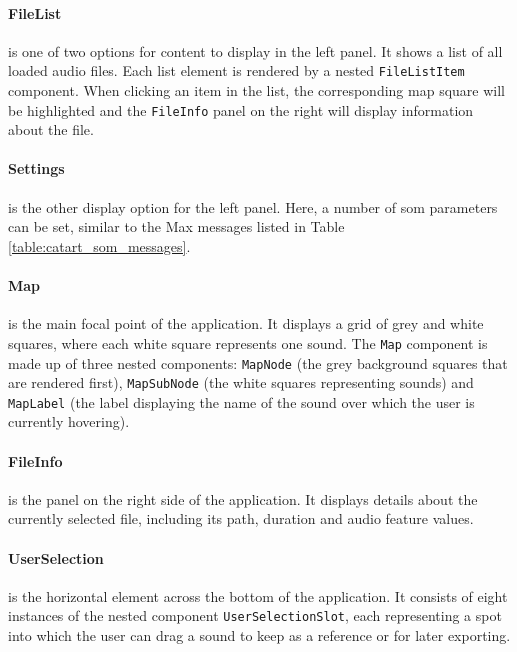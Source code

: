 \paragraph{FileList}
\label{para:file_list}
is one of two options for content to display in the left panel. It shows a list
of all loaded audio files. Each list element is rendered by a nested
\texttt{FileListItem} component. When clicking an item in the list, the
corresponding map square will be highlighted and the \texttt{FileInfo}
panel on the right will display information about the file.

\paragraph{Settings}
\label{para:settings}
is the other display option for the left panel. Here, a number of \gls{som}
parameters can be set, similar to the Max messages listed in Table
\ref{table:catart_som_messages}.

\paragraph{Map}
\label{para:map}
is the main focal point of the application. It displays a grid of grey and white
squares, where each white square represents one sound. The \texttt{Map}
component is made up of three nested components: \texttt{MapNode} (the
grey background squares that are rendered first), \texttt{MapSubNode}
(the white squares representing sounds) and \texttt{MapLabel} (the
label displaying the name of the sound over which the user is currently
hovering).

\paragraph{FileInfo}
\label{para:file_info}
is the panel on the right side of the application. It displays details about the
currently selected file, including its path, duration and audio feature values.

\paragraph{UserSelection}
\label{para:user_selection}
is the horizontal element across the bottom of the application. It consists of
eight instances of the nested component \texttt{UserSelectionSlot},
each representing a spot into which the user can drag a sound to keep as a
reference or for later exporting.

